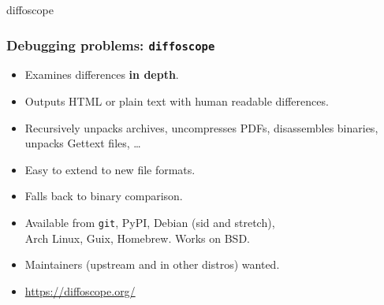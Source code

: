 \documentclass[14pt,aspectratio=169]{beamer}
\newif\ifplacelogo
\begin{document}
\placelogofalse

{

\begin{frame}{diffoscope}
 \frametitle{Debugging problems: \texttt{diffoscope}}

 \begin{itemize}
  \item Examines differences \textbf{in depth}.
  \item Outputs HTML or plain text with human readable differences.
  \item Recursively unpacks archives, uncompresses PDFs, disassembles
  binaries, unpacks Gettext files, …
  \item Easy to extend to new file formats.
  \item Falls back to binary comparison.
  \item Available from \texttt{git}, PyPI, Debian (sid and stretch), \\
   Arch Linux, Guix, Homebrew. Works on BSD.
  \item Maintainers (upstream and in other distros) wanted.
  \item \url{https://diffoscope.org/}
 \end{itemize}
\end{frame}


}
\end{document}
